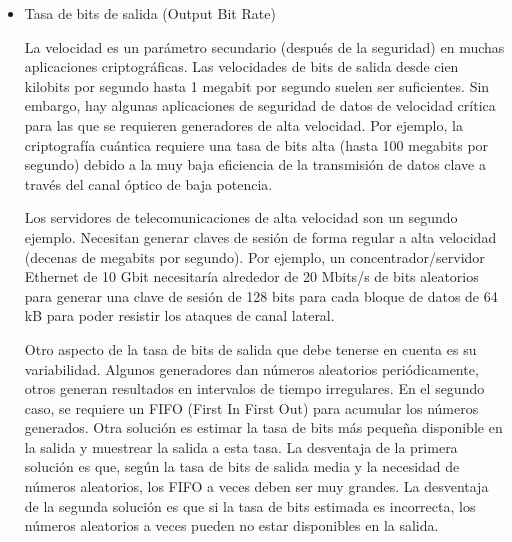 \begin{itemize}
					La calidad de la señal de ruido digital (la señal obtenida en el bloque de extracción de aleatoriedad) puede deteriorarse por varias razones: (a) la entropía de la fuente no es lo suficientemente alta (este suele ser el caso si se utiliza la metaestabilidad como fuente de aleatoriedad). ); (b) la entropía, que es alta en la señal original, no está bien extraída; (c) las muestras extraídas están correlacionadas. La entropía por bit a la salida del generador aumenta principalmente a costa de la reducción y/o variación de la tasa de bits.
					
					\begin{itemize}
						\item Corrector XOR
						\item Corrector de Von Neumann
						\item Linear Feedback Shift Registers (LFSRs)
						\item Funciones resilientes
						\item Cifrado de la señal de ruido digital
						\item Hashing de la señal de ruido digital
					\end{itemize}
					
					
				\item Tasa de bits de salida (Output Bit Rate)
				
					La velocidad es un parámetro secundario (después de la seguridad) en muchas aplicaciones criptográficas. Las velocidades de bits de salida desde cien kilobits por segundo hasta 1 megabit por segundo suelen ser suficientes. Sin embargo, hay algunas aplicaciones de seguridad de datos de velocidad crítica para las que se requieren generadores de alta velocidad. Por ejemplo, la criptografía cuántica requiere una tasa de bits alta (hasta 100 megabits por segundo) debido a la muy baja eficiencia de la transmisión de datos clave a través del canal óptico de baja potencia. 
					
					
					Los servidores de telecomunicaciones de alta velocidad son un segundo ejemplo. Necesitan generar claves de sesión de forma regular a alta velocidad (decenas de megabits por segundo). Por ejemplo, un concentrador/servidor Ethernet de 10 Gbit necesitaría alrededor de 20 Mbits/s de bits aleatorios para generar una clave de sesión de 128 bits para cada bloque de datos de 64 kB para poder resistir los ataques de canal lateral. 
					
					
					Otro aspecto de la tasa de bits de salida que debe tenerse en cuenta es su variabilidad. Algunos generadores dan números aleatorios periódicamente, otros generan resultados en intervalos de tiempo irregulares. En el segundo caso, se requiere un FIFO (First In First Out) para acumular los números generados. Otra solución es estimar la tasa de bits más pequeña disponible en la salida y muestrear la salida a esta tasa. La desventaja de la primera solución es que, según la tasa de bits de salida media y la necesidad de números aleatorios, los FIFO a veces deben ser muy grandes. La desventaja de la segunda solución es que si la tasa de bits estimada es incorrecta, los números aleatorios a veces pueden no estar disponibles en la salida.
					

\end{itemize}
